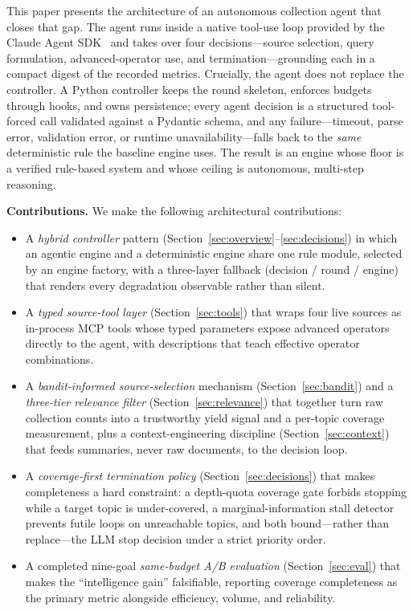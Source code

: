 \documentclass[conference]{IEEEtran}
\begin{document}
This paper presents the architecture of an autonomous collection agent that closes that gap. The agent runs inside a native tool-use loop provided by the Claude Agent SDK~\cite{claudeagentsdk} and takes over four decisions---source selection, query formulation, advanced-operator use, and termination---grounding each in a compact digest of the recorded metrics. Crucially, the agent does not replace the controller. A Python controller keeps the round skeleton, enforces budgets through hooks, and owns persistence; every agent decision is a structured tool-forced call validated against a Pydantic schema, and any failure---timeout, parse error, validation error, or runtime unavailability---falls back to the \emph{same} deterministic rule the baseline engine uses. The result is an engine whose floor is a verified rule-based system and whose ceiling is autonomous, multi-step reasoning.

\noindent\textbf{Contributions.} We make the following architectural contributions:
\begin{itemize}
  \item A \emph{hybrid controller} pattern (Section~\ref{sec:overview}--\ref{sec:decisions}) in which an agentic engine and a deterministic engine share one rule module, selected by an engine factory, with a three-layer fallback (decision / round / engine) that renders every degradation observable rather than silent.
  \item A \emph{typed source-tool layer} (Section~\ref{sec:tools}) that wraps four live sources as in-process MCP tools whose typed parameters expose advanced operators directly to the agent, with descriptions that teach effective operator combinations.
  \item A \emph{bandit-informed source-selection} mechanism (Section~\ref{sec:bandit}) and a \emph{three-tier relevance filter} (Section~\ref{sec:relevance}) that together turn raw collection counts into a trustworthy yield signal and a per-topic coverage measurement, plus a context-engineering discipline (Section~\ref{sec:context}) that feeds summaries, never raw documents, to the decision loop.
  \item A \emph{coverage-first termination policy} (Section~\ref{sec:decisions}) that makes completeness a hard constraint: a depth-quota coverage gate forbids stopping while a target topic is under-covered, a marginal-information stall detector prevents futile loops on unreachable topics, and both bound---rather than replace---the LLM stop decision under a strict priority order.
  \item A completed nine-goal \emph{same-budget A/B evaluation} (Section~\ref{sec:eval}) that makes the ``intelligence gain'' falsifiable, reporting coverage completeness as the primary metric alongside efficiency, volume, and reliability.
\end{itemize}
\end{document}

